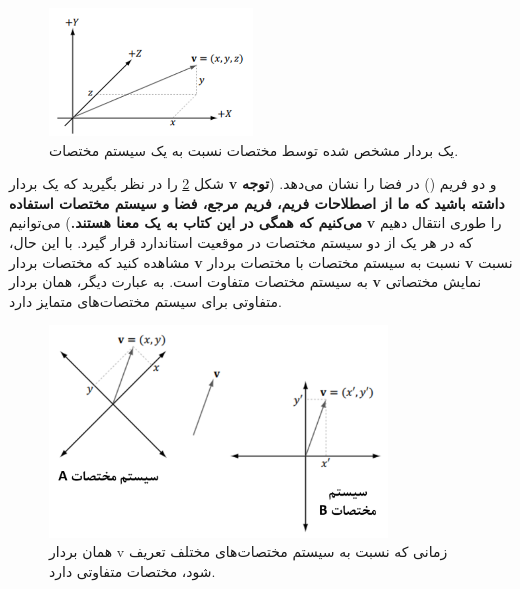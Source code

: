 {\begin{spacing}{1.5}
        \begin{figure}[H]
            \centering
            \setlength{\belowcaptionskip}{-10pt}
            \includegraphics[width=0.48\textwidth]{Images/4/1/4.Session.1.1.3}
            \caption{یک بردار مشخص شده توسط مختصات نسبت به یک سیستم مختصات.}
            \label{fig:4.Session.1.1.3}
        \end{figure}

        شکل \ref{fig:4.Session.1.1.4} را در نظر بگیرید که یک بردار \textbf{v} و دو فریم () در فضا را نشان می‌دهد. (\textbf{توجه داشته باشید که ما از اصطلاحات فریم، فریم مرجع، فضا و سیستم مختصات استفاده می‌کنیم که همگی در این کتاب به یک معنا هستند.})
        می‌توانیم \textbf{v} را طوری انتقال دهیم که در هر یک از دو سیستم مختصات در موقعیت استاندارد قرار گیرد. با این حال، مشاهده کنید که مختصات بردار \textbf{v} نسبت به سیستم مختصات  با مختصات بردار \textbf{v} نسبت به سیستم مختصات  متفاوت است.
        به عبارت دیگر، همان بردار \textbf{v} نمایش مختصاتی متفاوتی برای سیستم مختصات‌های متمایز دارد.

        \begin{figure}[H]
            \centering
            \setlength{\belowcaptionskip}{-10pt}
            \includegraphics[width=0.8\textwidth]{Images/4/1/4.Session.1.1.4}
            \caption{همان بردار v زمانی که نسبت به سیستم مختصات‌های مختلف تعریف شود، مختصات متفاوتی دارد.}
            \label{fig:4.Session.1.1.4}
        \end{figure}


\end{spacing}}
